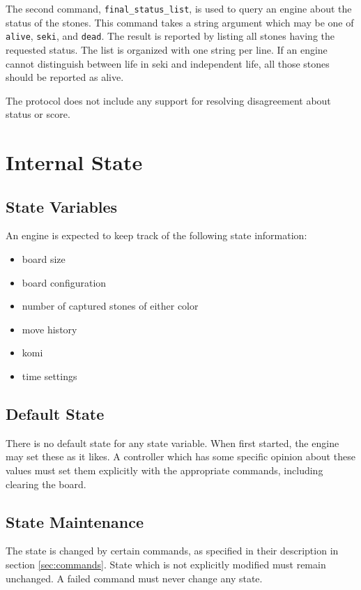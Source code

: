 \documentclass[a4paper]{article}
\begin{document}
The second command, \texttt{final\_status\_list}, is used to query an
engine about the status of the stones. This command takes a string
argument which may be one of \texttt{alive}, \texttt{seki}, and
\texttt{dead}. The result is reported by listing all stones having the
requested status. The list is organized with one string per line. If
an engine cannot distinguish between life in seki and independent
life, all those stones should be reported as alive.

The protocol does not include any support for resolving disagreement
about status or score.


\newpage
\section{Internal State}

\subsection{State Variables}
\label{sec:state-variables}

An engine is expected to keep track of the following state information:

\begin{itemize}
\item board size
\item board configuration
\item number of captured stones of either color
\item move history
\item komi
\item time settings
\end{itemize}

\subsection{Default State}
\label{sec:default-state}

There is no default state for any state variable. When first started,
the engine may set these as it likes. A controller which has some
specific opinion about these values must set them explicitly with the
appropriate commands, including clearing the board.

\subsection{State Maintenance}

The state is changed by certain commands, as specified in their
description in section \ref{sec:commands}. State which is not explicitly
modified must remain unchanged. A failed command must never change any
state.
\end{document}
